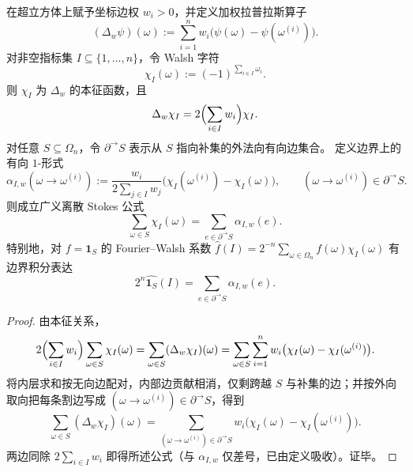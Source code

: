 \begin{theorem}\label{thm:fold-hypercube-weighted-walsh-stokes}
在超立方体上赋予坐标边权 \(w_i>0\)，并定义加权拉普拉斯算子
\[
(\Delta_w\psi)(\omega):=\sum_{i=1}^n w_i\bigl(\psi(\omega)-\psi(\omega^{(i)})\bigr).
\]
对非空指标集 \(I\subseteq\{1,\dots,n\}\)，令 Walsh 字符
\[
\chi_I(\omega):=(-1)^{\sum_{i\in I}\omega_i}.
\]
则 \(\chi_I\) 为 \(\Delta_w\) 的本征函数，且
\[
\Delta_w\chi_I=2\Bigl(\sum_{i\in I}w_i\Bigr)\chi_I.
\]
对任意 \(S\subseteq\Omega_n\)，令 \(\partial^{\to}S\) 表示从 \(S\) 指向补集的外法向有向边集合。
定义边界上的有向 \(1\)-形式
\[
\alpha_{I,w}(\omega\to\omega^{(i)})
:=\frac{w_i}{2\sum_{j\in I}w_j}\bigl(\chi_I(\omega^{(i)})-\chi_I(\omega)\bigr),
\qquad (\omega\to\omega^{(i)})\in\partial^{\to}S.
\]
则成立广义离散 Stokes 公式
\[
\boxed{\;\sum_{\omega\in S}\chi_I(\omega)=\sum_{e\in \partial^{\to}S}\alpha_{I,w}(e).\;}
\]
特别地，对 \(f=\mathbf 1_S\) 的 Fourier--Walsh 系数
\(
\widehat f(I)=2^{-n}\sum_{\omega\in\Omega_n}f(\omega)\chi_I(\omega)
\)
有边界积分表达
\[
2^n\widehat{\mathbf 1_S}(I)=\sum_{e\in \partial^{\to}S}\alpha_{I,w}(e).
\]
\end{theorem}
\begin{proof}
由本征关系，
\[
2\Bigl(\sum_{i\in I}w_i\Bigr)\sum_{\omega\in S}\chi_I(\omega)
=\sum_{\omega\in S}(\Delta_w\chi_I)(\omega)
=\sum_{\omega\in S}\sum_{i=1}^n w_i\bigl(\chi_I(\omega)-\chi_I(\omega^{(i)})\bigr).
\]
将内层求和按无向边配对，内部边贡献相消，仅剩跨越 \(S\) 与补集的边；并按外向取向把每条割边写成 \((\omega\to\omega^{(i)})\in\partial^{\to}S\)，得到
\[
\sum_{\omega\in S}(\Delta_w\chi_I)(\omega)
=\sum_{(\omega\to\omega^{(i)})\in\partial^{\to}S}w_i\bigl(\chi_I(\omega)-\chi_I(\omega^{(i)})\bigr).
\]
两边同除 \(2\sum_{i\in I}w_i\) 即得所述公式（与 \(\alpha_{I,w}\) 仅差号，已由定义吸收）。证毕。
\end{proof}



